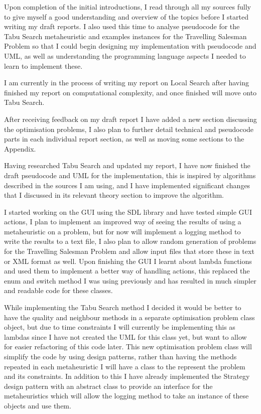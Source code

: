 \documentclass[]{final_report}
\begin{document}
Upon completion of the initial introductions, I read through all my sources fully to give myself a good understanding and overview of the topics before I started writing my draft reports. I also used this time to analyse pseudocode for the Tabu Search metaheuristic and examples instances for the Travelling Salesman Problem so that I could begin designing my implementation with pseudocode and UML, as well as understanding the programming language aspects I needed to learn to implement these.

I am currently in the process of writing my report on Local Search after having finished my report on computational complexity, and once finished will move onto Tabu Search.

After receiving feedback on my draft report I have added a new section discussing the optimisation problems, I also plan to further detail technical and pseudocode parts in each individual report section, as well as moving some sections to the Appendix.

Having researched Tabu Search and updated my report, I have now finished the draft pseudocode and UML for the implementation, this is inspired by algorithms described in the sources I am using, and I have implemented significant changes that I discussed in its relevant theory section to improve the algorithm.

I started working on the GUI using the SDL library and have tested simple GUI actions, I plan to implement an improved way of seeing the results of using a metaheuristic on a problem, but for now will implement a logging method to write the results to a text file, I also plan to allow random generation of problems for the Travelling Salesman Problem and allow input files that store these in text or XML format as well. Upon finishing the GUI I learnt about lambda functions and used them to implement a better way of handling actions, this replaced the enum and switch method I was using previously and has resulted in much simpler and readable code for these classes.

While implementing the Tabu Search method I decided it would be better to have the quality and neighbour methods in a separate optimisation problem class object, but due to time constraints I will currently be implementing this as lambdas since I have not created the UML for this class yet, but want to allow for easier refactoring of this code later. This new optimisation problem class will simplify the code by using design patterns, rather than having the methods repeated in each metaheuristic I will have a class to the represent the problem and its constraints. In addition to this I have already implemented the Strategy design pattern with an abstract class to provide an interface for the metaheuristics which will allow the logging method to take an instance of these objects and use them.
\end{document}
